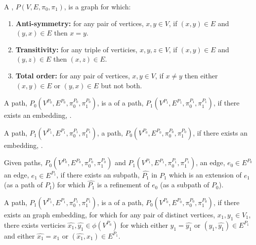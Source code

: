 \documentclass[a4paper,openany]{amsart}
\begin{document}
\begin{definition}
A , $P(V, E, \pi_0, \pi_1)$, is a graph for which:

\begin{enumerate}
\item \textbf{Anti-symmetry:} for any pair of vertices, $x, y \in V$, if $(x,y) \in E$ and
$(y,x) \in E$ then $x = y$.

\item \textbf{Transitivity:} for any triple of verticies, $x, y, z \in V$, 
if $(x,y) \in E$ and $(y,z) \in E$ then $(x,z) \in E$.

\item \textbf{Total order:} for any pair of vertices, $x, y \in V$, if $x \neq y$ then
either $(x,y) \in E$ or $(y,x) \in E$ but not both.
\end{enumerate}
\end{definition}

\begin{definition}
A path, $P_0(V^{P_0}, E^{P_0}, \pi^{P_0}_0, \pi^{P_0}_1)$, is a  of a
path, $P_1(V^{P_1}, E^{P_1}, \pi^{P_1}_0, \pi^{P_1}_1)$, if there exists an embedding,
.

A path, $P_1(V^{P_1}, E^{P_1}, \pi^{P_1}_0, \pi^{P_1}_1)$,  a path,
$P_0(V^{P_0}, E^{P_0}, \pi^{P_0}_0, \pi^{P_0}_1)$, if there exists an embedding,
.

\end{definition}

\begin{definition}
Given paths, $P_0(V^{P_0}, E^{P_0}, \pi^{P_0}_0, \pi^{P_0}_1)$ and $P_1(V^{P_1}, E^{P_1},
\pi^{P_1}_0, \pi^{P_1}_1)$, an edge, $e_0 \in E^{P_0}$  an edge, $e_1 \in
E^{P_1}$, if there exists an subpath, $\hat{P_1}$ in $P_1$ which is an extension of $e_1$
(as a path of $P_1$) for which $\hat{P_1}$ is a refinement of $e_0$ (as a subpath of
$P_0$).
\end{definition}

\begin{definition}
A path, $P_1(V^{P_1}, E^{P_1}, \pi^{P_1}_0, \pi^{P_1}_1)$, is a  of a
path, $P_0(V^{P_0}, E^{P_0}, \pi^{P_0}_0, \pi^{P_0}_1)$, if there exists an graph
embedding,  for which for any pair of distinct vertices, $x_1, y_1
\in V_1$, there exists verticies $\hat{x_1}, \hat{y_1} \in \phi(V^{P_0})$ for which either 
$y_1 = \hat{y_1}$ or $(y_1, \hat{y_1}) \in E^{P_1}$ and either $\hat{x_1} = x_1$ or 
$(\hat{x_1}, x_1) \in E^{P_1}$.
\end{definition}
\end{document}
